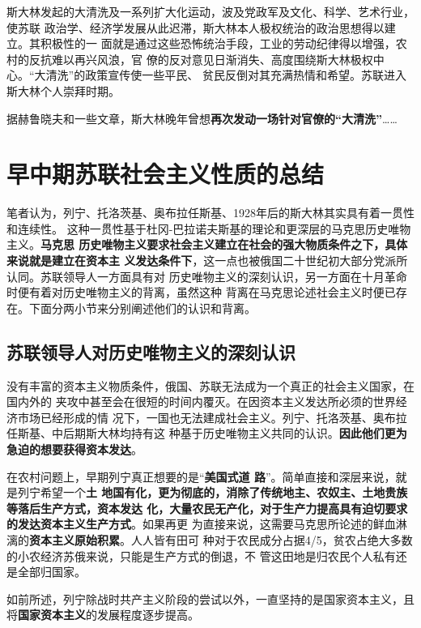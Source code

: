\begin{enumerate}
  斯大林发起的大清洗及一系列扩大化运动，波及党政军及文化、科学、艺术行业，使苏联
  政治学、经济学发展从此迟滞，斯大林本人极权统治的政治思想得以建立。其积极性的一
  面就是通过这些恐怖统治手段，工业的劳动纪律得以增强，农村的反抗难以再兴风浪，官
  僚的反对意见日渐消失、高度围绕斯大林极权中心。``大清洗''的政策宣传使一些平民、
  贫民反倒对其充满热情和希望。苏联进入斯大林个人崇拜时期。

  据赫鲁晓夫和一些文章，斯大林晚年曾想\textbf{再次发动一场针对官僚的``大清洗''}……
\end{enumerate}

\section{早中期苏联社会主义性质的总结}

笔者认为，列宁、托洛茨基、奥布拉任斯基、1928年后的斯大林其实具有着一贯性和连续性。
这种一贯性基于杜冈-巴拉诺夫斯基的理论和更深层的马克思历史唯物主义。\textbf{马克思
  历史唯物主义要求社会主义建立在社会的强大物质条件之下，具体来说就是建立在资本主
  义发达条件下}，这一点也被俄国二十世纪初大部分党派所认同。苏联领导人一方面具有对
历史唯物主义的深刻认识，另一方面在十月革命时便有着对历史唯物主义的背离，虽然这种
背离在马克思论述社会主义时便已存在。下面分两小节来分别阐述他们的认识和背离。

\subsection{苏联领导人对历史唯物主义的深刻认识}

没有丰富的资本主义物质条件，俄国、苏联无法成为一个真正的社会主义国家，在国内外的
夹攻中甚至会在很短的时间内覆灭。在因资本主义发达所必须的世界经济市场已经形成的情
况下，一国也无法建成社会主义。列宁、托洛茨基、奥布拉任斯基、中后期斯大林均持有这
种基于历史唯物主义共同的认识。\textbf{因此他们更为急迫的想要获得资本发达}。

在农村问题上，早期列宁真正想要的是``\textbf{美国式道
  路}''\cite{chenxintianamerica}。简单直接和深层来说，就是列宁希望一个\textbf{土
  地国有化，更为彻底的，消除了传统地主、农奴主、土地贵族等落后生产方式，资本发达
  化，大量农民无产化，对于生产力提高具有迫切要求的发达资本主义生产方式}。如果再更
为直接来说，这需要马克思所论述的鲜血淋漓的\textbf{资本主义原始积累}。人人皆有田可
种对于农民成分占据4/5，贫农占绝大多数的小农经济苏俄来说，只能是生产方式的倒退，不
管这田地是归农民个人私有还是全部归国家。

如前所述，列宁除战时共产主义阶段的尝试以外，一直坚持的是国家资本主义，且
将\textbf{国家资本主义}的发展程度逐步提高。

